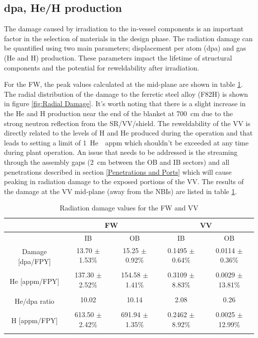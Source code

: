 \documentclass[12pt, letterpaper]{elsarticle}
\begin{document}
\subsection{dpa, He/H production} \label{dpa, He/H production}
The damage caused by irradiation to the in-vessel components is an important factor in the selection of materials in the design phase. The radiation damage can be quantified using two main parameters; displacement per atom (dpa) and gas (He and H) production. These parameters impact the lifetime of structural components and the potential for reweldability after irradiation.\vspace{5mm}

For the FW, the peak values calculated at the mid-plane are shown in table \ref{Radiation damage values for the FW and VV}. The radial distribution of the damage to the ferretic steel alloy (F82H) is shown in figure \ref{fig:Radial Damage}. It's worth noting that there is a slight increase in the He and H production near the end of the blanket at \SI{700}{cm} due to the strong neutron reflection from the SR/VV/shield. The reweldability of the VV is directly related to the levels of H and He produced during the operation and that leads to setting a limit of \SI{1}{He \hspace{1 mm} appm} which shouldn't be exceeded at any time during plant operation. An issue that needs to be addressed is the streaming through the assembly gaps (\SI{2}{cm} between the OB and IB sectors) and all penetrations described in section \ref{Penetrations and Ports} which will cause peaking in radiation damage to the exposed portions of the VV. The results of the damage at the VV mid-plane (away from the NBIs) are listed in table \ref{Radiation damage values for the FW and VV}.   
\begin{table}[h!]
	\caption{Radiation damage values for the FW and VV}
	\label{Radiation damage values for the FW and VV}
	\begin{tabular}{ |c|c|c|c|c| } 
		\hline
		{} & \multicolumn{2}{|c|}{FW} & \multicolumn{2}{|c|}{VV} \\
		\hline
		{} & IB & OB & IB & OB \\
		\hline
		\multirow{2}{6em}{Damage [dpa/FPY]} & 13.70 $\pm$ 1.53\% & 15.25 $\pm$ 0.92\% & 0.1495 $\pm$ 0.64\% & 0.0114 $\pm$ 0.36\%  \\
		& {} & {} & {} & {} \\
		\hline
		\multirow{2}{6em}{He [appm/FPY]} & 137.30 $\pm$ 2.52\% & 154.58 $\pm$ 1.41\% & 0.3109 $\pm$ 8.83\% & 0.0029 $\pm$ 13.81\%  \\
		& {} & {} & {} & {} \\
		\hline
		\multirow{2}{6em}{He/dpa ratio} & 10.02 & 10.14 & 2.08 & 0.26  \\
		& {} & {} & {} & {} \\
		\hline
		\multirow{2}{6em}{H [appm/FPY]} & 613.50 $\pm$ 2.42\% & 691.94 $\pm$ 1.35\% & 0.2462 $\pm$ 8.92\% & 0.0025 $\pm$ 12.99\%  \\
		& {} & {} & {} & {} \\
		\hline
	\end{tabular}
\end{table}
\end{document}
